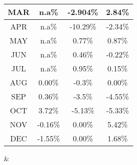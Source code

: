 \documentclass{article}
\begin{document}
\begin{landscape}
\begin{center}
\begin{tabular}
{\begin{tabular}{|c|c|c|c|}
    \rowcolor{lightgray}%
    MAR & n.a\% & -2.904\% & 2.84\%\\%
    \hline%
    \rowcolor{white}%
    APR & n.a\% & -10.29\% & -2.34\%\\%
    \hline%
    \rowcolor{lightgray}%
    MAY & n.a\% & 0.77\% & 0.87\%\\%
    \hline%
    \rowcolor{white}%
    JUN & n.a\% & 0.46\% & -0.22\%\\%
    \hline%
    \rowcolor{lightgray}%
    JUL & n.a\% & 0.95\% & 0.15\%\\%
    \hline%
    \rowcolor{white}%
    AUG & 0.00\% & -0.3\% & 0.00\%\\%
    \hline%
    \rowcolor{lightgray}%
    SEP & 0.36\% & -3.5\% & -4.55\%\\%
    \hline%
    \rowcolor{white}%
    OCT & 3.72\% & -5.13\% & -5.33\%\\%
    \hline%
    \rowcolor{lightgray}%
    NOV & -0.16\% & 0.00\% & 5.42\%\\%
    \hline%
    \rowcolor{white}%
    DEC & -1.55\% & 0.00\% & 1.68\%\\%
    \hline%
    \end{tabular}
}
&
\end{tabular}
\end{center}
\end{landscape}
\end{document}
